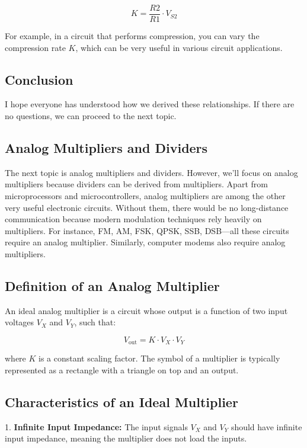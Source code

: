 \documentclass[a4paper,9pt,twoside,openany,twocolumn]{memoir}
\begin{document}
\[
K = \frac{R2}{R1} \cdot V_{S2}
\]

For example, in a circuit that performs compression, you can vary the compression rate \( K \), which can be very useful in various circuit applications.

\subsection*{Conclusion}

I hope everyone has understood how we derived these relationships. If there are no questions, we can proceed to the next topic.

\subsection*{Analog Multipliers and Dividers}

The next topic is analog multipliers and dividers. However, we'll focus on analog multipliers because dividers can be derived from multipliers. Apart from microprocessors and microcontrollers, analog multipliers are among the other very useful electronic circuits. Without them, there would be no long-distance communication because modern modulation techniques rely heavily on multipliers. For instance, FM, AM, FSK, QPSK, SSB, DSB—all these circuits require an analog multiplier. Similarly, computer modems also require analog multipliers.

\subsection*{Definition of an Analog Multiplier}

An ideal analog multiplier is a circuit whose output is a function of two input voltages \( V_X \) and \( V_Y \), such that:

\[
V_{\text{out}} = K \cdot V_X \cdot V_Y
\]

where \( K \) is a constant scaling factor. The symbol of a multiplier is typically represented as a rectangle with a triangle on top and an output.

\subsection*{Characteristics of an Ideal Multiplier}


1. \textbf{Infinite Input Impedance:} The input signals $V_X$ and $V_Y$ should have infinite input impedance, meaning the multiplier does not load the inputs.\\
\end{document}
